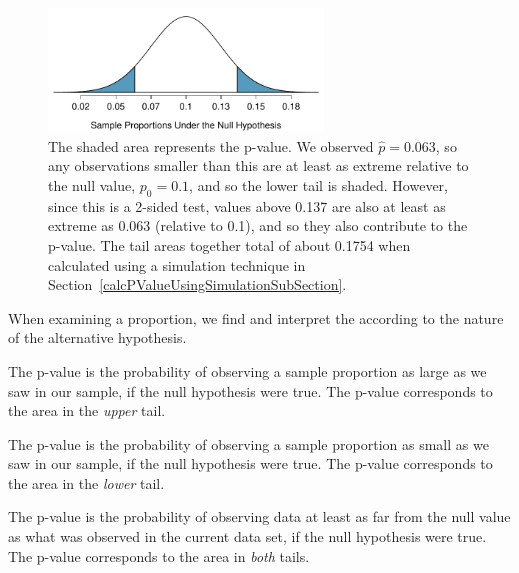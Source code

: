 \begin{figure}[ht]
\centering
\includegraphics[width=0.65\textwidth]{ch_inference_foundations/figures/MedicalConsultant/MedConsNullNormal}
\caption{The shaded area represents the p-value. We observed $\hat{p} = 0.063$, so any observations smaller than this are at least as extreme relative to the null value, $p_0 = 0.1$, and so the lower tail is shaded. However, since this is a 2-sided test, values above 0.137 are also at least as extreme as 0.063 (relative to 0.1), and so they also contribute to the p-value. The tail areas together total of about 0.1754 when calculated using a simulation technique in Section~\ref{calcPValueUsingSimulationSubSection}.}
\label{MedConsNullNormal}
\end{figure}

\begin{termBox}{
When examining a proportion, we find and interpret the  according to the nature of the alternative hypothesis.\vspace{-1mm}
\begin{description}
\setlength{\itemsep}{0mm}
\item[$H_A: p > p_0.$ ] The p-value is the probability of observing a sample proportion as large as we saw in our sample, if the null hypothesis were true. The p-value corresponds to the area in the \emph{upper} tail.
\item[$H_A: p < p_0.$ ]The p-value is the probability of observing a sample proportion as small as we saw in our sample, if the null hypothesis were true. The p-value corresponds to the area in the \emph{lower} tail.
\item[$H_A: p \ne p_0.$] The p-value is the probability of observing data at least as far from the null value as what was observed in the current data set, if the null hypothesis were true. The p-value corresponds to the area in \emph{both} tails.
\end{description}}
\end{termBox}

